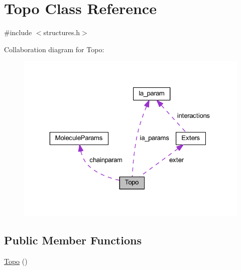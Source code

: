 \hypertarget{class_topo}{\section{Topo Class Reference}
\label{class_topo}
}


{\ttfamily \#include $<$structures.\+h$>$}



Collaboration diagram for Topo\+:\nopagebreak
\begin{figure}[H]
\begin{center}
\leavevmode
\includegraphics[width=325pt]{class_topo__coll__graph}
\end{center}
\end{figure}
\subsection*{Public Member Functions}
\begin{DoxyCompactItemize}
\item 
\hyperlink{class_topo_a5813947d825f62aa340c98a1ef2c9f69}{Topo} ()
\end{DoxyCompactItemize}
